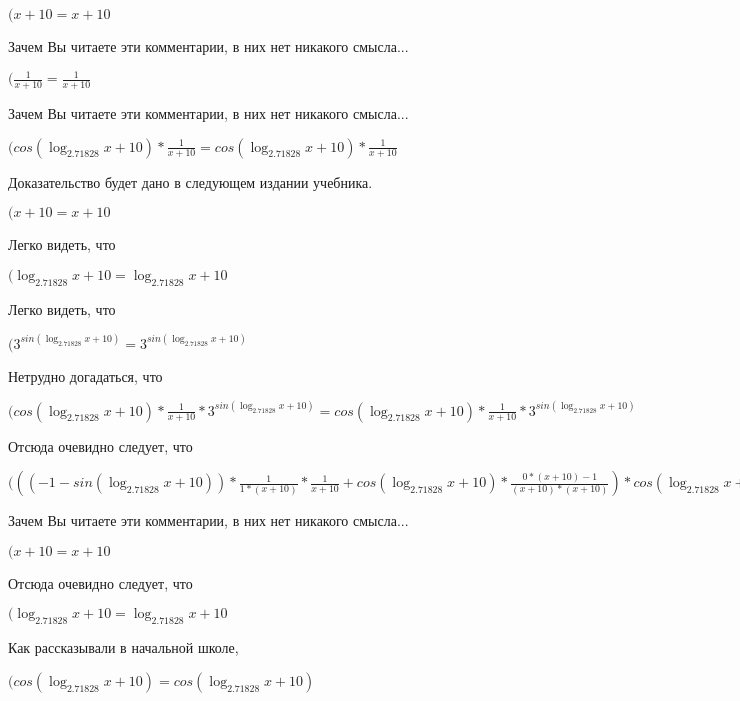 \documentclass[12pt,a4paper,fleqn]{article}
\theoremstyle{definition}
\begin{document}
$( x  +  10  =  x  +  10 $

Зачем Вы читаете эти комментарии, в них нет никакого смысла...

$(\frac{ 1 }{ x  +  10 }
 = \frac{ 1 }{ x  +  10 }
$

Зачем Вы читаете эти комментарии, в них нет никакого смысла...

$(cos(\log_{ 2.71828 }{ x  +  10 }) * \frac{ 1 }{ x  +  10 }
 = cos(\log_{ 2.71828 }{ x  +  10 }) * \frac{ 1 }{ x  +  10 }
$

Доказательство будет дано в следующем издании учебника.

$( x  +  10  =  x  +  10 $

Легко видеть, что

$(\log_{ 2.71828 }{ x  +  10 } = \log_{ 2.71828 }{ x  +  10 }$

Легко видеть, что

$({ 3 }^{sin(\log_{ 2.71828 }{ x  +  10 })} = { 3 }^{sin(\log_{ 2.71828 }{ x  +  10 })}$

Нетрудно догадаться, что

$(cos(\log_{ 2.71828 }{ x  +  10 }) * \frac{ 1 }{ x  +  10 }
 * { 3 }^{sin(\log_{ 2.71828 }{ x  +  10 })} = cos(\log_{ 2.71828 }{ x  +  10 }) * \frac{ 1 }{ x  +  10 }
 * { 3 }^{sin(\log_{ 2.71828 }{ x  +  10 })}$

Отсюда очевидно следует, что

$((( -1  - sin(\log_{ 2.71828 }{ x  +  10 })) * \frac{ 1 }{ 1  * ( x  +  10 )}
 * \frac{ 1 }{ x  +  10 }
 + cos(\log_{ 2.71828 }{ x  +  10 }) * \frac{ 0  * ( x  +  10 ) -  1 }{( x  +  10 ) * ( x  +  10 )}
) * cos(\log_{ 2.71828 }{ x  +  10 }) * \frac{ 1 }{ x  +  10 }
 * { 3 }^{sin(\log_{ 2.71828 }{ x  +  10 })} = (( -1  - sin(\log_{ 2.71828 }{ x  +  10 })) * \frac{ 1 }{ 1  * ( x  +  10 )}
 * \frac{ 1 }{ x  +  10 }
 + cos(\log_{ 2.71828 }{ x  +  10 }) * \frac{ 0  * ( x  +  10 ) -  1 }{( x  +  10 ) * ( x  +  10 )}
) * cos(\log_{ 2.71828 }{ x  +  10 }) * \frac{ 1 }{ x  +  10 }
 * { 3 }^{sin(\log_{ 2.71828 }{ x  +  10 })}$

Зачем Вы читаете эти комментарии, в них нет никакого смысла...

$( x  +  10  =  x  +  10 $

Отсюда очевидно следует, что

$(\log_{ 2.71828 }{ x  +  10 } = \log_{ 2.71828 }{ x  +  10 }$

Как рассказывали в начальной школе,

$(cos(\log_{ 2.71828 }{ x  +  10 }) = cos(\log_{ 2.71828 }{ x  +  10 })$
\end{document}
